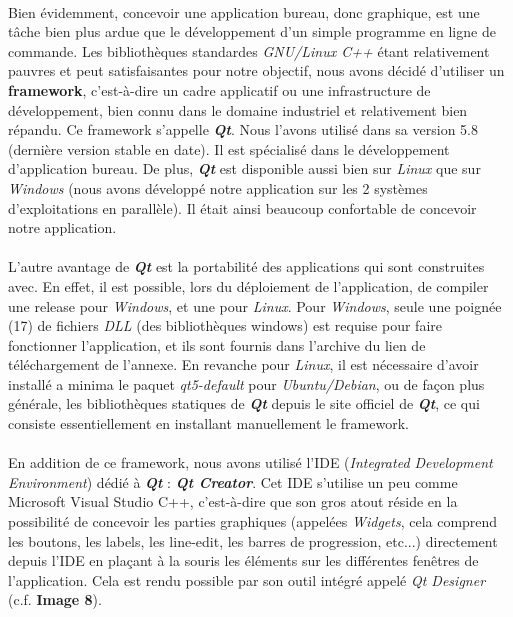 \documentclass[12pt, a4paper]{report}
\begin{document}
\paragraph{}Bien évidemment, concevoir une application bureau, donc graphique, est une tâche bien plus ardue que le développement d'un simple programme en ligne de commande. Les bibliothèques standardes \textit{GNU/Linux C++} étant relativement pauvres et peut satisfaisantes pour notre objectif, nous avons décidé d'utiliser un \textbf{framework}, c'est-à-dire un cadre applicatif ou une infrastructure de développement, bien connu dans le domaine industriel et relativement bien répandu. Ce framework s'appelle \textbf{\textit{Qt}}. Nous l'avons utilisé dans sa version 5.8 (dernière version stable en date). Il est spécialisé dans le développement d'application bureau. De plus, \textbf{\textit{Qt}} est disponible aussi bien sur \textit{Linux} que sur \textit{Windows} (nous avons développé notre application sur les 2 systèmes d'exploitations en parallèle). Il était ainsi beaucoup confortable de concevoir notre application.

\paragraph{}L'autre avantage de \textbf{\textit{Qt}} est la portabilité des applications qui sont construites avec. En effet, il est possible, lors du déploiement de l'application, de compiler une release pour \textit{Windows}, et une pour \textit{Linux}. Pour \textit{Windows}, seule une poignée (17) de fichiers \textit{DLL} (des bibliothèques windows) est requise pour faire fonctionner l'application, et ils sont fournis dans l'archive du lien de téléchargement de l'annexe. En revanche pour \textit{Linux}, il est nécessaire d'avoir installé a minima le paquet \textit{qt5-default} pour \textit{Ubuntu/Debian}, ou de façon plus générale, les bibliothèques statiques de \textbf{\textit{Qt}} depuis le site officiel de \textbf{\textit{Qt}}, ce qui consiste essentiellement en installant manuellement le framework.

\paragraph{}En addition de ce framework, nous avons utilisé l'IDE (\textit{Integrated Development Environment}) dédié à \textbf{\textit{Qt}} : \textbf{\textit{Qt Creator}}. Cet IDE s'utilise un peu comme Microsoft Visual Studio C++, c'est-à-dire que son gros atout réside en la possibilité de concevoir les parties graphiques (appelées \textit{Widgets}, cela comprend les boutons, les labels, les line-edit, les barres de progression, etc...) directement depuis l'IDE en plaçant à la souris les éléments sur les différentes fenêtres de l'application. Cela est rendu possible par son outil intégré appelé \textit{Qt Designer} (c.f. \textbf{Image 8}).
\end{document}
